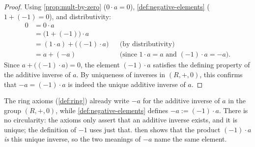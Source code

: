 \begin{content}


\begin{proof}
Using \cref{prop:mult-by-zero} ($0 \cdot a = 0$), \cref{def:negative-elements} ($1 + (-1) = 0$), and distributivity:
\begin{align*}
0 &= 0 \cdot a \\
&= \bigl(1 + (-1)\bigr) \cdot a \\
&= (1 \cdot a) + \bigl((-1) \cdot a\bigr) && \text{(by distributivity)} \\
&= a + (-a) && \text{(since $1 \cdot a = a$ and $(-1) \cdot a = -a$)}.
\end{align*}
Since $a + \bigl((-1) \cdot a\bigr) = 0$, the element $(-1) \cdot a$ satisfies the defining property of the additive inverse of $a$. By uniqueness of inverses in $(R, +, 0)$, this confirms that $-a = (-1) \cdot a$ is indeed the unique additive inverse of $a$.
\end{proof}

\begin{steps}
The ring axioms (\cref{def:ring}) already write $-a$ for the additive inverse of $a$ in the group $(R, +, 0)$, while \cref{def:negative-elements} defines $-a := (-1) \cdot a$. There is no circularity: the axioms only assert that an additive inverse exists, and it is unique; the definition of $-1$ uses just that.  then shows that the product $(-1) \cdot a$ \emph{is} this unique inverse, so the two meanings of $-a$ name the same element.
\end{steps}
\end{content}

